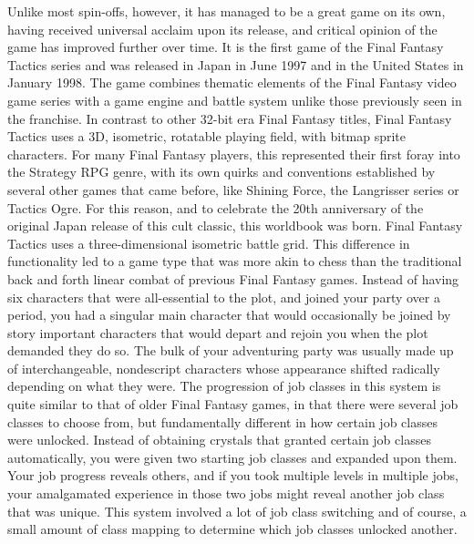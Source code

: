 Unlike most spin-offs, however, it has managed to be a great game on its own, having received universal acclaim upon its release, and critical opinion of the game has improved further over time. 
It is the first game of the Final Fantasy Tactics series and was released in Japan in June 1997 and in the United States in January 1998. 
The game combines thematic elements of the Final Fantasy video game series with a game engine and battle system unlike those previously seen in the franchise. 
In contrast to other 32-bit era Final Fantasy titles, Final Fantasy Tactics uses a 3D, isometric, rotatable playing field, with bitmap sprite characters.
For many Final Fantasy players, this represented their first foray into the Strategy RPG genre, with its own quirks and conventions established by several other games that came before, like Shining Force, the Langrisser series or Tactics Ogre. 
For this reason, and to celebrate the 20th anniversary of the original Japan release of this cult classic, this worldbook was born.
%
\vfill
%
Final Fantasy Tactics uses a three-dimensional isometric battle grid. 
This difference in functionality led to a game type that was more akin to chess than the traditional back and forth linear combat of previous Final Fantasy games. 
Instead of having six characters that were all-essential to the plot, and joined your party over a period, you had a singular main character that would occasionally be joined by story important characters that would depart and rejoin you when the plot demanded they do so. 
The bulk of your adventuring party was usually made up of interchangeable, nondescript characters whose appearance shifted radically depending on what  they were.
The progression of job classes in this system is quite similar to that of older Final Fantasy games, in that there were several job classes to choose from, but fundamentally different in how certain
job classes were unlocked. 
Instead of obtaining crystals that granted certain job classes automatically, you were given two starting job classes and expanded upon them. 
Your job progress reveals others, and if you took multiple levels in multiple jobs, your amalgamated experience in those two jobs might reveal another job class that was unique. 
This system involved a lot of job class switching and of course, a small amount of class mapping to determine which job classes unlocked another.
%
\vfill
%
\\\\
